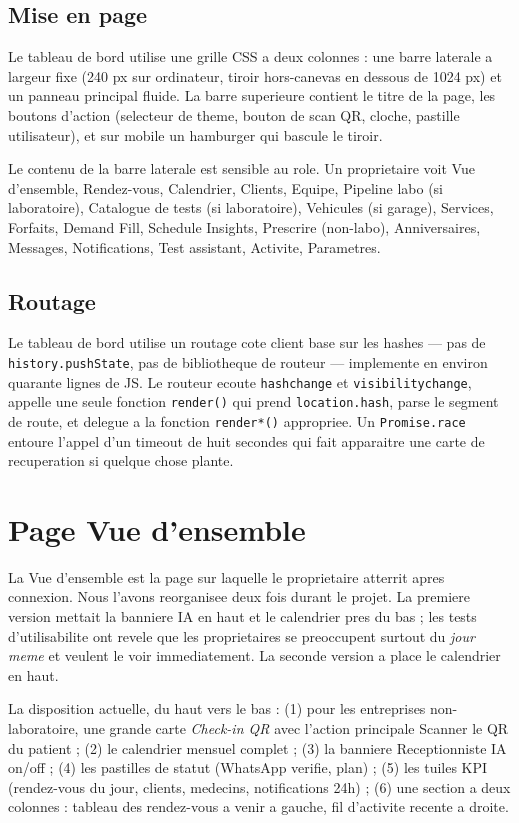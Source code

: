 \subsection{Mise en page}
Le tableau de bord utilise une grille CSS a deux colonnes : une barre
laterale a largeur fixe (240 px sur ordinateur, tiroir hors-canevas en
dessous de 1024 px) et un panneau principal fluide. La barre superieure
contient le titre de la page, les boutons d'action (selecteur de theme,
bouton de scan QR, cloche, pastille utilisateur), et sur mobile un
hamburger qui bascule le tiroir.

Le contenu de la barre laterale est sensible au role. Un proprietaire
voit Vue d'ensemble, Rendez-vous, Calendrier, Clients, Equipe, Pipeline
labo (si laboratoire), Catalogue de tests (si laboratoire), Vehicules
(si garage), Services, Forfaits, Demand Fill, Schedule Insights,
Prescrire (non-labo), Anniversaires, Messages, Notifications, Test
assistant, Activite, Parametres.

\subsection{Routage}
Le tableau de bord utilise un routage cote client base sur les hashes
--- pas de \texttt{history.pushState}, pas de bibliotheque de routeur
--- implemente en environ quarante lignes de JS. Le routeur ecoute
\texttt{hashchange} et \texttt{visibilitychange}, appelle une seule
fonction \texttt{render()} qui prend \texttt{location.hash}, parse le
segment de route, et delegue a la fonction \texttt{render*()}
appropriee. Un \texttt{Promise.race} entoure l'appel d'un timeout de
huit secondes qui fait apparaitre une carte de recuperation si quelque
chose plante.

\section{Page Vue d'ensemble}
La Vue d'ensemble est la page sur laquelle le proprietaire atterrit
apres connexion. Nous l'avons reorganisee deux fois durant le projet.
La premiere version mettait la banniere IA en haut et le calendrier
pres du bas ; les tests d'utilisabilite ont revele que les
proprietaires se preoccupent surtout du \emph{jour meme} et veulent le
voir immediatement. La seconde version a place le calendrier en haut.

La disposition actuelle, du haut vers le bas : (1) pour les entreprises
non-laboratoire, une grande carte \emph{Check-in QR} avec l'action
principale \og Scanner le QR du patient \fg{} ; (2) le calendrier
mensuel complet ; (3) la banniere Receptionniste IA on/off ; (4) les
pastilles de statut (WhatsApp verifie, plan) ; (5) les tuiles KPI
(rendez-vous du jour, clients, medecins, notifications 24h) ; (6) une
section a deux colonnes : tableau des rendez-vous a venir a gauche, fil
d'activite recente a droite.

